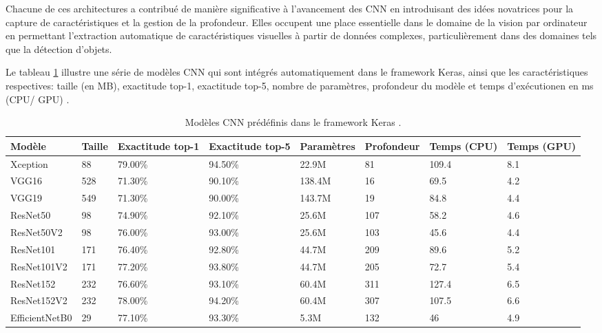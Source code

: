 Chacune de ces architectures a contribué de manière significative à l'avancement des CNN en introduisant des idées novatrices pour la capture de caractéristiques et la gestion de la profondeur. Elles occupent une place essentielle dans le domaine de la vision par ordinateur en permettant l'extraction automatique de caractéristiques visuelles à partir de données complexes, particulièrement dans des domaines tels que la détection d'objets.

Le tableau \ref{tab:my-table} illustre une série de modèles CNN qui sont intégrés automatiquement dans le framework Keras, ainsi que les caractéristiques respectives: taille (en MB), exactitude top-1, exactitude top-5, nombre de paramètres, profondeur du modèle et temps d'exécutionen en ms (CPU/ GPU) \cite{ch2_KerasApp87}.

\begin{table}[h]
\centering
\caption{Modèles CNN prédéfinis dans le framework Keras \cite{ch2_KerasApp87}.}
\label{tab:my-table}
\resizebox{\columnwidth}{!}
{
    \begin{tabular}{|l|l|l|l|l|l|p{2cm}|p{2cm}|}
    \hline
    Modèle & Taille & Exactitude top-1 & Exactitude top-5  & Paramètres & Profondeur & Temps (CPU) & Temps (GPU) \\
    \hline
    Xception          & 88     & 79.00\% & 94.50\% & 22.9M  & 81  & 109.4  & 8.1  \\
    VGG16             & 528    & 71.30\% & 90.10\% & 138.4M & 16  & 69.5   & 4.2  \\
    VGG19             & 549    & 71.30\% & 90.00\% & 143.7M & 19  & 84.8   & 4.4  \\
    ResNet50          & 98     & 74.90\% & 92.10\% & 25.6M  & 107 & 58.2   & 4.6  \\
    ResNet50V2        & 98     & 76.00\% & 93.00\% & 25.6M  & 103 & 45.6   & 4.4  \\
    ResNet101         & 171    & 76.40\% & 92.80\% & 44.7M  & 209 & 89.6   & 5.2  \\
    ResNet101V2       & 171    & 77.20\% & 93.80\% & 44.7M  & 205 & 72.7   & 5.4  \\
    ResNet152         & 232    & 76.60\% & 93.10\% & 60.4M  & 311 & 127.4  & 6.5  \\
    ResNet152V2       & 232    & 78.00\% & 94.20\% & 60.4M  & 307 & 107.5  & 6.6  \\
    EfficientNetB0    & 29     & 77.10\% & 93.30\% & 5.3M   & 132 & 46     & 4.9  \\
    \hline  
    \end{tabular}   
}
\end{table}


